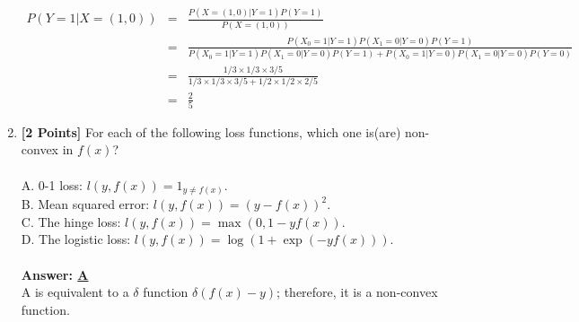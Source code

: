 \documentclass{article}
\begin{document}
\begin{enumerate}
		\begin{equation}
		\nonumber
		\begin{array}{rcl}
		P(Y=1|X=(1,0)) & = & \frac{P(X=(1,0)|Y=1)P(Y=1)}{P(X=(1,0))} \\
					   & = & \frac{P(X_0=1|Y=1)P(X_1=0|Y=0)P(Y=1)}{P(X_0=1|Y=1)P(X_1=0|Y=0)P(Y=1)+P(X_0=1|Y=0)P(X_1=0|Y=0)P(Y=0)} \\
					   & = & \frac{1/3\times1/3\times3/5}{1/3\times1/3\times3/5+1/2\times1/2\times2/5} \\
					   & = & \frac{2}{5}
		\end{array}
		\end{equation}

		\item \textbf{[2 Points]} For each of the following loss functions, which one is(are) non-convex in $f(x)$? \\ \\
		A. 0-1 loss: $l(y,f(x))=1_{y\ne f(x)}$. \\
		B. Mean squared error: $l(y,f(x))=(y-f(x))^2$.  \\
		C. The hinge loss: $l(y,f(x))=\max(0,1-yf(x))$. \\
		D. The logistic loss: $l(y,f(x))=\log(1+\exp(-yf(x)))$. \\
		\\
		\textbf{Answer: \underline{A}}\\
		A is equivalent to a $\delta$ function $\delta(f(x)-y)$; therefore, it is a non-convex function.
		

\end{enumerate}
\end{document}
